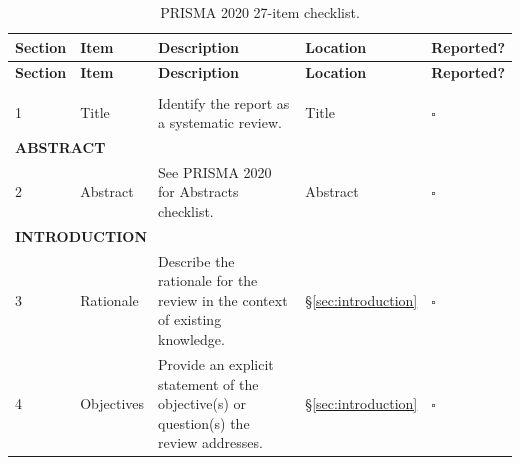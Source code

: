 
\begin{longtable}{p{0.5cm} p{3cm} p{6cm} p{2cm} p{1.5cm}}
\caption{PRISMA 2020 27-item checklist.}\\
\toprule
\textbf{Section} & \textbf{Item} & \textbf{Description} & \textbf{Location} & \textbf{Reported?} \\
\midrule
\endfirsthead
\toprule
\textbf{Section} & \textbf{Item} & \textbf{Description} & \textbf{Location} & \textbf{Reported?} \\
\midrule
\endhead
\bottomrule
\endfoot

\multicolumn{5}{l}{\textbf{TITLE}} \\
\midrule
1 & Title & Identify the report as a systematic review. & Title & $\square$ \\
\midrule

\multicolumn{5}{l}{\textbf{ABSTRACT}} \\
\midrule
2 & Abstract & See PRISMA 2020 for Abstracts checklist. & Abstract & $\square$ \\
\midrule

\multicolumn{5}{l}{\textbf{INTRODUCTION}} \\
\midrule
3 & Rationale & Describe the rationale for the review in the context of existing knowledge. & \S\ref{sec:introduction} & $\square$ \\
4 & Objectives & Provide an explicit statement of the objective(s) or question(s) the review addresses. & \S\ref{sec:introduction} & $\square$ \\
\midrule


\end{longtable}

